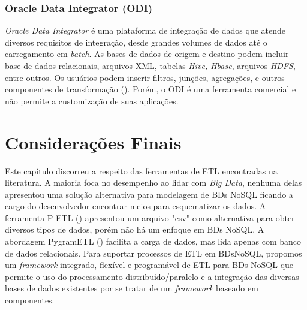\subsubsection{Oracle Data Integrator (ODI)}

\textit{Oracle Data Integrator} é uma plataforma de integração de dados que atende diversos requisitos de integração, desde grandes volumes de dados até o carregamento em \textit{batch}. As bases de dados de origem e destino podem incluir base de dados relacionais, arquivos XML, tabelas \textit{Hive, Hbase}, arquivos \textit{HDFS}, entre outros. Os usuários podem inserir filtros, junções, agregações, e outros componentes de transformação (\cite{silva:2016}). Porém, o ODI é uma ferramenta comercial e não permite a customização de suas aplicações.

\section{Considerações Finais}

Este capítulo discorreu a respeito das ferramentas de ETL encontradas na literatura. A maioria foca no desempenho ao lidar com \textit{Big Data}, nenhuma delas apresentou uma solução alternativa para modelagem de BDs NoSQL ficando a cargo do desenvolvedor encontrar meios para esquematizar os dados. A ferramenta P-ETL (\cite{bala:2014}) apresentou um arquivo "csv" como alternativa para obter diversos tipos de dados, porém não há um enfoque em BDs NoSQL. A abordagem PygramETL (\cite{thomsen:2009}) facilita a carga de dados, mas lida apenas com banco de dados relacionais. Para suportar processos de ETL em BDsNoSQL, propomos um \textit{framework} integrado, flexível e programável de ETL para BDs NoSQL que permite o uso do processamento distribuído/paralelo e a integração das diversas bases de dados existentes por se tratar de um \textit{framework} baseado em componentes.  